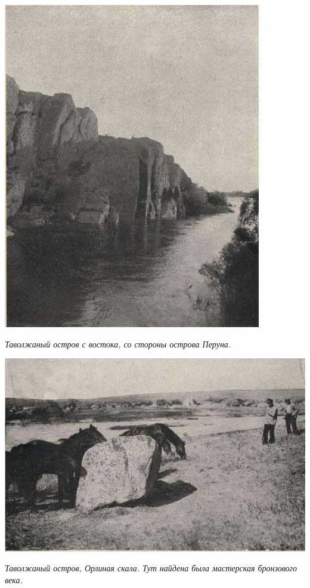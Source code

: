 \newpage
\vspace*{\fill}
\begin{center}
\includegraphics[width=\linewidth]{chast-zmiy/ktotakiezmei/tav03.jpg}

\textit{Таволжаный остров с востока, со стороны острова Перуна.}
\end{center}
\vspace*{\fill}
\newpage
\vspace*{\fill}
\begin{center}
\includegraphics[width=\linewidth]{chast-zmiy/ktotakiezmei/tav02.jpg}

\textit{Таволжаный остров, Орлиная скала. Тут найдена была мастерская бронзового века.}
\end{center}


